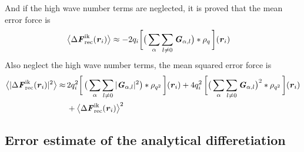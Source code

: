 \documentclass[aps,pre,preprint]{revtex4}
\renewcommand{\v}[1]{\textbf{\textit{#1}}}
\begin{document}
And if the high wave number terms are neglected, it is proved that the
mean error force is
\begin{align}
  \big\langle
  \Delta\v F_{\textrm{rec}}^{\textrm{ik}}(\v r_i)
  \big\rangle
  & \approx
  - 2 q_i
  \bigg[
  \big(
  \sum_{\alpha}\sum_{l\neq 0}\v G_{\alpha,l}
  \big)
  \ast\rho_q\,
  \bigg] (\v r_i)
\end{align}
Also neglect the high wave number terms, the mean squared error force is 
\begin{align}\nonumber
  \big\langle
  \vert\Delta\v F_{\textrm{rec}}^{\textrm{ik}}(\v r_i)\vert^2
  \big\rangle
  \approx&\, 
  2q_i^2
  \bigg[\,
  \big(
  \sum_{\alpha} \sum_{l\neq 0}
  \vert \v G_{\alpha,l}\vert^2
  \big)
  \ast \rho_{q^2}
  \,\bigg] (\v r_i)
  +
  4q_i^2\,
  \bigg[
  \big(
  \sum_{\alpha} \sum_{l\neq 0}  
  \v G_{\alpha,l}
  \big)^2
  \ast \rho_{q^2}\,
  \bigg] (\v r_i) \\
  &\,+
  \big\langle
  \Delta\v F_{\textrm{rec}}^{\textrm{ik}}(\v r_i)
  \big\rangle  ^2
\end{align}






\subsection{Error estimate of the analytical differetiation}
\end{document}
